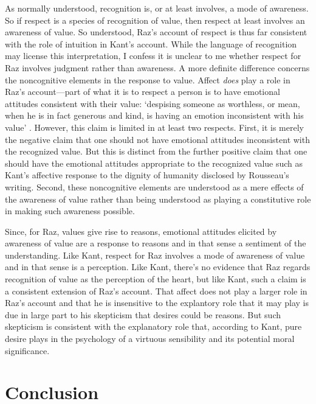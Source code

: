 \documentclass[12pt]{article}
\begin{document}
As normally understood, recognition is, or at least involves, a mode of awareness. So if respect is a species of recognition of value, then respect at least involves an awareness of value. So understood, Raz's account of respect is thus far consistent with the role of intuition in Kant's account. While the language of recognition may license this interpretation, I confess it is unclear to me whether respect for Raz involves judgment rather than awareness. A more definite difference concerns the noncognitive elements in the response to value. Affect \emph{does} play a role in Raz's account---part of what it is to respect a person is to have emotional attitudes consistent with their value: `despising someone as worthless, or mean, when he is in fact generous and kind, is having an emotion inconsistent with his value' \citep[161]{Raz:2001ps}. However, this claim is limited in at least two respects. First, it is merely the negative claim that one should not have emotional attitudes inconsistent with the recognized value. But this is distinct from the further positive claim that one should have the emotional attitudes appropriate to the recognized value such as Kant's affective response to the dignity of humanity disclosed by Rousseau's writing. Second, these noncognitive elements are understood as a mere effects of the awareness of value rather than being understood as playing a constitutive role in making such awareness possible. 

Since, for Raz, values give rise to reasons, emotional attitudes elicited by awareness of value are a response to reasons and in that sense a sentiment of the understanding. Like Kant, respect for Raz involves a mode of awareness of value and in that sense is a perception. Like Kant, there's no evidence that Raz regards recognition of value as the perception of the heart, but like Kant, such a claim is a consistent extension of Raz's account. That affect does not play a larger role in Raz's account and that he is insensitive to the explantory role that it may play is due in large part to his skepticism that desires could be reasons. But such skepticism is consistent with the explanatory role that, according to Kant, pure desire plays in the psychology of a virtuous sensibility and its potential moral significance. 




\section{Conclusion} \label{sec:conclusion} %
\end{document}
